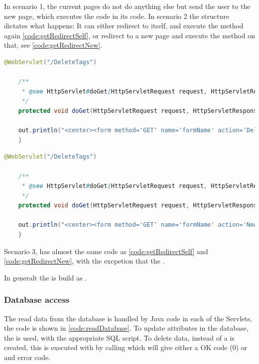 In scenario 1, the current pages do not do anything else but send the user to the new page, which executes the code in its  code. In scenario 2 the  structure dictates what happens: It can either redirect to itself, and execute the  method again \autoref{code:getRedirectSelf}, or redirect to a new page and execute the  method on that, see \autoref{code:getRedirectNew}.

\begin{lstlisting}[language=Java,label=code:getRedirectSelf,caption=A form which redirect to its own get method]
	@WebServlet("/DeleteTags")
	
	/**
	 * @see HttpServlet#doGet(HttpServletRequest request, HttpServletResponse response)
	 */
	protected void doGet(HttpServletRequest request, HttpServletResponse response) throws ServletException, IOException {
	
	out.println("<center><form method='GET' name='formName' action='DeleteTags'>");
	}
\end{lstlisting}

\begin{lstlisting}[language=Java,label=code:getRedirectNew,caption=A form which redirect to its own get method]
	@WebServlet("/DeleteTags")
	
	/**
	 * @see HttpServlet#doGet(HttpServletRequest request, HttpServletResponse response)
	 */
	protected void doGet(HttpServletRequest request, HttpServletResponse response) throws ServletException, IOException {
	
	out.println("<center><form method='GET' name='formName' action='NewPage'>");
	}
\end{lstlisting}

Secnario 3, has almost the same code as \autoref{code:getRedirectSelf} and \autoref{code:getRedirectNew}, with the excpetion that the .

In generalt the  is build as .

\subsubsection{Database access}
The read data from the database is handled by Java code in each of the Servlets, the code is shown in \autoref{code:readDatabase}. To update attributes in the database, the  is used, with the appropriate SQL script.  To delete data, instead of  a  is created, this is executed with by calling  which will give either a OK code (0) or and error code. 

